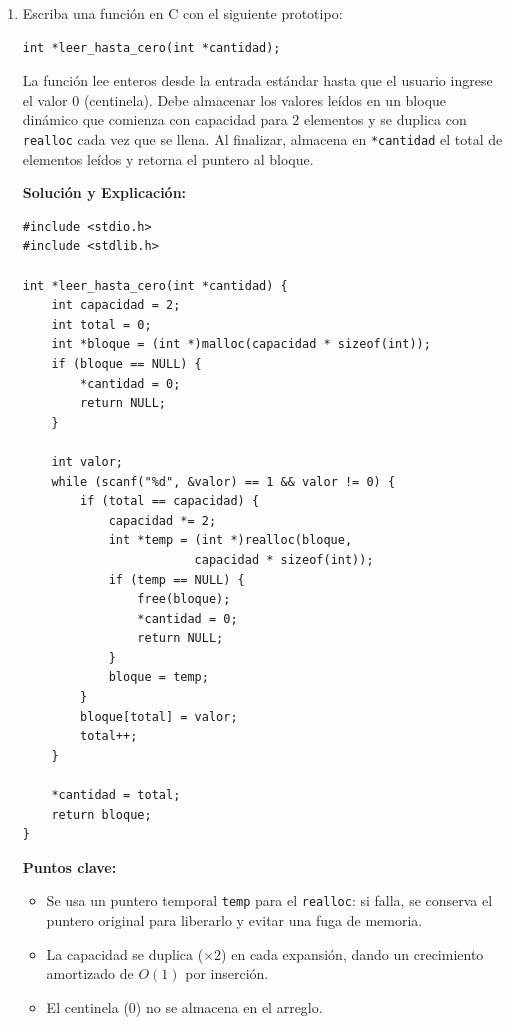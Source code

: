\documentclass[11pt,letterpaper]{article}
\begin{document}
\begin{enumerate}[label=\textbf{\arabic*.}]
    \newpage
    \begin{enumerate}[label=(\alph*), resume]
        \item Escriba una función en C con el siguiente prototipo:
        \begin{lstlisting}[style=customc, numbers=none]
int *leer_hasta_cero(int *cantidad);
        \end{lstlisting}
        La función lee enteros desde la entrada estándar hasta que el usuario ingrese el valor $0$ (centinela). Debe almacenar los valores leídos en un bloque dinámico que comienza con capacidad para $2$ elementos y se duplica con \texttt{realloc} cada vez que se llena. Al finalizar, almacena en \texttt{*cantidad} el total de elementos leídos y retorna el puntero al bloque.

        \begin{solucionbox}
        \textbf{Solución y Explicación:}

        \begin{lstlisting}[style=customc]
#include <stdio.h>
#include <stdlib.h>

int *leer_hasta_cero(int *cantidad) {
    int capacidad = 2;
    int total = 0;
    int *bloque = (int *)malloc(capacidad * sizeof(int));
    if (bloque == NULL) {
        *cantidad = 0;
        return NULL;
    }

    int valor;
    while (scanf("%d", &valor) == 1 && valor != 0) {
        if (total == capacidad) {
            capacidad *= 2;
            int *temp = (int *)realloc(bloque,
                        capacidad * sizeof(int));
            if (temp == NULL) {
                free(bloque);
                *cantidad = 0;
                return NULL;
            }
            bloque = temp;
        }
        bloque[total] = valor;
        total++;
    }

    *cantidad = total;
    return bloque;
}
        \end{lstlisting}
        \noindent \textbf{Puntos clave:}
        \begin{itemize}[noitemsep]
            \item Se usa un puntero temporal \texttt{temp} para el \texttt{realloc}: si falla, se conserva el puntero original para liberarlo y evitar una fuga de memoria.
            \item La capacidad se duplica ($\times 2$) en cada expansión, dando un crecimiento amortizado de $O(1)$ por inserción.
            \item El centinela ($0$) no se almacena en el arreglo.
        \end{itemize}
        \end{solucionbox}
    \end{enumerate}


\end{enumerate}
\end{document}
